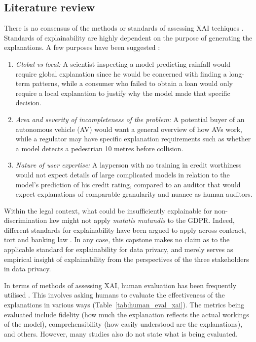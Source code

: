 \subsection{Literature review}
There is no consensus of the methods or standards of assessing XAI techiques \cite{vilone2021}. Standards of explainability are highly dependent on the purpose of generating the explanations. A few purposes have been suggested \cite{doshi-velez2017}:
\begin{enumerate}
	\item \textit{Global vs local:} A scientist inspecting a model predicting rainfall would require global explanation since he would be concerned with finding a long-term patterns, while a consumer who failed to obtain a loan would only require a local explanation to justify why the model made that specific decision.
	\item \textit{Area and severity of incompleteness of the problem:} A potential buyer of an autonomous vehicle (AV) would want a general overview of how AVs work, while a regulator may have specific explanation requirements such as whether a model detects a pedestrian 10 metres before collision.
	\item \textit{Nature of user expertise:} A layperson with no training in credit worthiness would not expect details of large complicated models in relation to the model's prediction of his credit rating, compared to an auditor that would expect explanations of comparable granularity and nuance as human auditors.
\end{enumerate}

Within the legal context, what could be insufficiently explainable for non-discrimination law \cite{vale2022explainable} might not apply \textit{mutatis mutandis} to the GDPR. Indeed, different standards for explainability have been argued to apply across contract, tort and banking law \cite{hacker2022varieties}. In any case, this capstone makes no claim as to the applicable standard for explainability for data privacy, and merely serves as empirical insight of explainability from the perspectives of the three stakeholders in data privacy.

In terms of methods of assessing XAI, human evaluation has been frequently utilised \cite{danilevsky2020}. This involves asking humans to evaluate the effectiveness of the explanations in various ways (Table~\ref{tab:human_eval_xai}). The metrics being evaluated include fidelity (how much the explanation reflects the actual workings of the model), comprehensibility (how easily understood are the explanations), and others. However, many studies also do not state what is being evaluated. 

